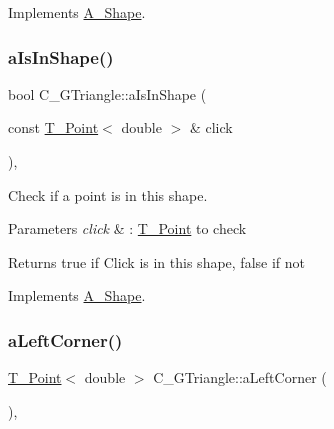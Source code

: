 Implements \hyperlink{classA__Shape_a24991f7667367b646cae75f60df22e28}{A\+\_\+\+Shape}.

\mbox{\label{classC__GTriangle_a417b28c74dd35f81a19b5bd1d214ba8d}} 
\subsubsection{\texorpdfstring{a\+Is\+In\+Shape()}{aIsInShape()}}
{\footnotesize\ttfamily bool C\+\_\+\+G\+Triangle\+::a\+Is\+In\+Shape (\begin{DoxyParamCaption}\item[{const \hyperlink{classT__Point}{T\+\_\+\+Point}$<$ double $>$ \&}]{click }\end{DoxyParamCaption})\hspace{0.3cm}{\ttfamily [override]}, {\ttfamily [virtual]}}



Check if a point is in this shape. 


\begin{DoxyParams}{Parameters}
{\em click} & \+: \hyperlink{classT__Point}{T\+\_\+\+Point} to check \\
\hline
\end{DoxyParams}
\begin{DoxyReturn}{Returns}
true if Click is in this shape, false if not 
\end{DoxyReturn}


Implements \hyperlink{classA__Shape_a63f825cbc9780208d9a137f5c14917d0}{A\+\_\+\+Shape}.

\mbox{\label{classC__GTriangle_a57943afaad0f6b7c3c13aa35a233e93b}} 
\subsubsection{\texorpdfstring{a\+Left\+Corner()}{aLeftCorner()}}
{\footnotesize\ttfamily \hyperlink{classT__Point}{T\+\_\+\+Point}$<$ double $>$ C\+\_\+\+G\+Triangle\+::a\+Left\+Corner (\begin{DoxyParamCaption}{ }\end{DoxyParamCaption})\hspace{0.3cm}{\ttfamily [override]}, {\ttfamily [virtual]}}



